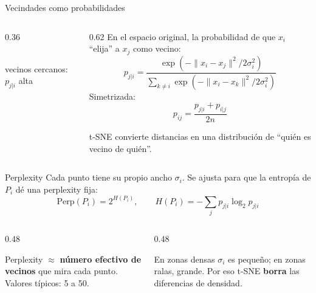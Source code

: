 \documentclass[aspectratio=169,12pt]{beamer}
\begin{document}
\begin{frame}{Vecindades como probabilidades}
  \begin{columns}[c]
    \begin{column}{0.36\textwidth}
      \centering
      \\[2pt]{\scriptsize vecinos cercanos: $p_{j|i}$ alta}
    \end{column}
    \begin{column}{0.62\textwidth}
      \small En el espacio original, la probabilidad de que $x_i$ ``elija'' a $x_j$ como vecino:
      \[ p_{j|i} = \frac{\exp\!\left(-\lVert x_i - x_j\rVert^2 / 2\sigma_i^2\right)}{\sum_{k\neq i}\exp\!\left(-\lVert x_i - x_k\rVert^2 / 2\sigma_i^2\right)} \]
      Simetrizada:
      \[ p_{ij} = \frac{p_{j|i} + p_{i|j}}{2n} \]
      \begin{keybox}
        \small t-SNE convierte distancias en una distribución de ``quién es vecino de quién''.
      \end{keybox}
    \end{column}
  \end{columns}
\end{frame}

\begin{frame}{Perplexity}
  \small Cada punto tiene su propio ancho $\sigma_i$. Se ajusta para que la entropía de $P_i$ dé una perplexity fija:
  \[ \text{Perp}(P_i) = 2^{H(P_i)}, \qquad H(P_i) = -\sum_j p_{j|i}\log_2 p_{j|i} \]
  \begin{columns}[T]
    \begin{column}{0.48\textwidth}
      \begin{defbox}[Lectura]
        \small Perplexity $\approx$ \textbf{número efectivo de vecinos} que mira cada punto. Valores típicos: 5 a 50.
      \end{defbox}
    \end{column}
    \begin{column}{0.48\textwidth}
      \begin{defbox}
        \small En zonas densas $\sigma_i$ es pequeño; en zonas ralas, grande. Por eso t-SNE \textbf{borra} las diferencias de densidad.
      \end{defbox}
    \end{column}
  \end{columns}
\end{frame}
\end{document}
